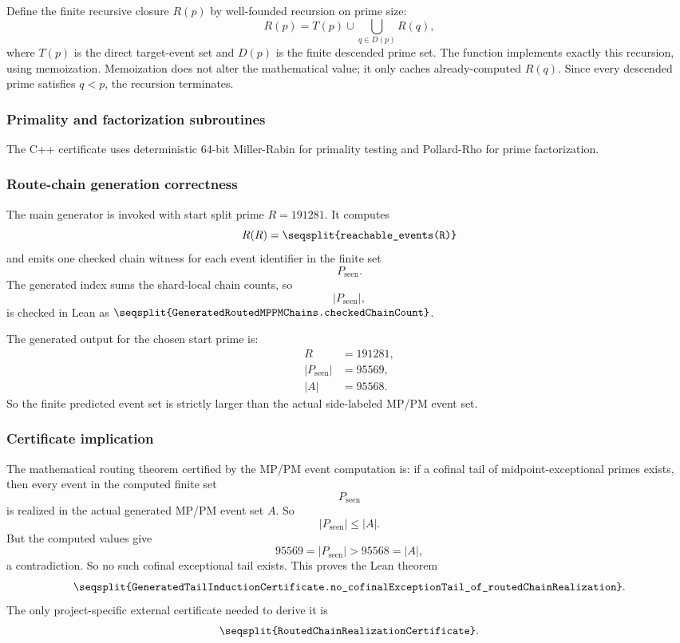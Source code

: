 \documentclass[11pt]{article}
\newcommand{\Lean}[1]{\texttt{\seqsplit{#1}}}
\newcommand{\Code}[1]{\texttt{\seqsplit{#1}}}
\begin{document}
Define the finite recursive closure \(R(p)\) by well-founded recursion on
prime size:
\[
  R(p)=T(p)\cup\bigcup_{q\in D(p)}R(q),
\]
where \(T(p)\) is the direct target-event set and \(D(p)\) is the finite
descended prime set.  The function \Code{reachable\_events(p)} implements
exactly this recursion, using memoization.  Memoization does not alter the
mathematical value; it only caches already-computed \(R(q)\).  Since every
descended prime satisfies \(q<p\), the recursion terminates.

\subsubsection{Primality and factorization subroutines}

The C++ certificate uses deterministic 64-bit Miller-Rabin for primality
testing and Pollard-Rho for prime factorization.

\subsubsection{Route-chain generation correctness}

The main generator is invoked with start split prime \(R=191281\).  It computes
\[
  R(R)=\Code{reachable\_events(R)}
\]
and emits one checked chain witness for each event identifier in the finite set
\[
  P_{\operatorname{seen}}.
\]
The generated index sums the shard-local chain counts, so
\[
  |P_{\operatorname{seen}}|,
\]
is checked in Lean as \(\Lean{GeneratedRoutedMPPMChains.checkedChainCount}\).

The generated output for the chosen start prime is:
\[
\begin{aligned}
  R&=191281,\\
  |P_{\operatorname{seen}}|&=95569,\\
  |A|&=95568.
\end{aligned}
\]
So the finite predicted event set is strictly larger than the actual
side-labeled MP/PM event set.

\subsubsection{Certificate implication}

The mathematical routing theorem certified by the MP/PM event computation is:
if a cofinal tail of midpoint-exceptional primes exists, then every event in
the computed finite set
\[
  P_{\operatorname{seen}}
\]
is realized in the actual generated MP/PM event set \(A\).
So
\[
  |P_{\operatorname{seen}}|\le |A|.
\]
But the computed values give
\[
  95569=|P_{\operatorname{seen}}|>95568=|A|,
\]
a contradiction.  So no such cofinal exceptional tail exists.  This proves the
Lean theorem
\[
  \Lean{GeneratedTailInductionCertificate.no\_cofinalExceptionTail\_of\_routedChainRealization}.
\]
The only project-specific external certificate needed to derive it is
\[
  \Lean{RoutedChainRealizationCertificate}.
\]
\end{document}
